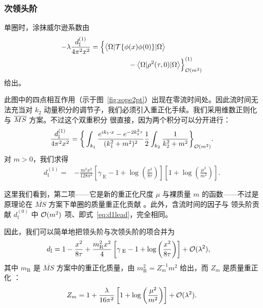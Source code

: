 \subsubsection{次领头阶}

单圈时，涂抹威尔逊系数由
\begin{align}
-\lambda\frac{d_{\mathbb{I}}^{(1)}}{4\pi^2x^2} = {} & \Big\{\big\langle
\Omega |
{\cal T}\{
\phi(x){} \phi(0)\} | \Omega \big\rangle \nonumber\\
{} & \qquad \qquad  - \big\langle \Omega |
\rho^2(\tau,0)  | \Omega
\big\rangle\Big\}_{{\cal O}(m^2)}^{(1)}
\end{align}
给出。

此图中的四点相互作用（示于图~\ref{fig:sope2pt}）出现在零流时间处。因此流时间无法充当对
$k_2$ 动量积分的调节子，我们必须引入重正化手续。我们采用维数正则化与 $\overline{MS}$ 方案。不过这个双重积分
很直接，因为两个积分可以分开进行：
\begin{equation}\label{eq:d11loop}
\frac{d_{\mathbb{I}}^{(1)}}{4\pi^2x^2}=  \bigg\{\int_{k_1}
\frac{e^{ik_1 \cdot
x} - e^{- 2k_1^2\tau}}{(k_1^2+m^2)^2}
\frac{1}{2}\int_{k_2}\frac{1}{k_2^2+m^2}\bigg\}_{{
\cal O}(m^2)}.
\end{equation}
对 $m>0$，我们求得
\begin{align}
d_{\mathbb{I}}^{(1)} = {} & -
\frac{m^2x^2}{128\pi^2}\left[\gamma_{\;\mathrm{E}}-1+\log\left(\frac{x^2}{
8\tau } \right)\right]\left[
1+ \log\left(\frac{\mu^2}{m^2}\right)\right].
\end{align}

这里我们看到，第二项——它是新的重正化尺度 $\mu$ 与裸质量 $m$ 的函数——不过是原理论在
$\overline{MS}$ 方案下单圈的质量重正化贡献 \cite{Kleinert:2001ax}。此外，含流时间的因子与
领头阶贡献 $d_{\mathbb{I}}^{(0)}$ 中 ${\cal O}(m^2)$ 项、即式~\eqref{eq:d1lead}，完全相同。

因此，我们可以简单地把领头阶与次领头阶的项合并为
\begin{align}
d_{\mathbb{I}} = {} & 1 -
\frac{x^2}{8\tau}  +\frac{m_{\mathrm{R}}^2x^2}{4}\left[\gamma_{\;\mathrm{E}} -1
+
\log\left(\frac{x^2}{8\tau}\right)\right]  +{\cal O}(\lambda^2),
\end{align}
其中 $m_{\mathrm{R}}$ 是 $\overline{MS}$ 方案中的重正化质量，由
$m^2_{\mathrm{R}} = Z_m^{-1}m^2$ 给出，而 $Z_m$ 是质量重正化 \cite{Kleinert:2001ax}：
\begin{equation}
Z_m = 1+\frac{\lambda}{16\pi^2}\left[
1+ \log\left(\frac{\mu^2}{m^2}\right)\right]+{\cal O}(\lambda^2).
\end{equation}

